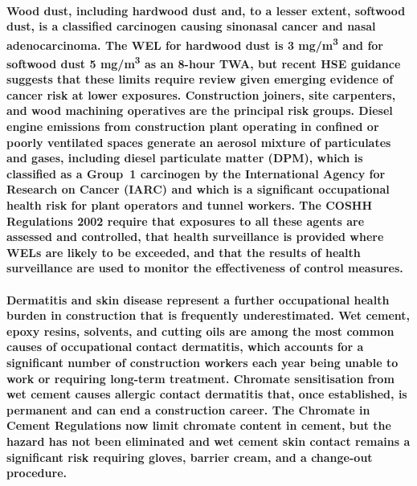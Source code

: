 \paragraph{Wood dust, including hardwood dust and, to a lesser extent, softwood dust, is a classified carcinogen causing sinonasal cancer and nasal adenocarcinoma. The WEL for hardwood dust is 3 mg/m\textsuperscript{3} and for softwood dust 5 mg/m\textsuperscript{3} as an 8-hour TWA, but recent HSE guidance suggests that these limits require review given emerging evidence of cancer risk at lower exposures. Construction joiners, site carpenters, and wood machining operatives are the principal risk groups. Diesel engine emissions from construction plant operating in confined or poorly ventilated spaces generate an aerosol mixture of particulates and gases, including diesel particulate matter (DPM), which is classified as a Group~1 carcinogen by the International Agency for Research on Cancer (IARC) and which is a significant occupational health risk for plant operators and tunnel workers. The COSHH Regulations 2002 require that exposures to all these agents are assessed and controlled, that health surveillance is provided where WELs are likely to be exceeded, and that the results of health surveillance are used to monitor the effectiveness of control measures.}

\paragraph{Dermatitis and skin disease represent a further occupational health burden in construction that is frequently underestimated. Wet cement, epoxy resins, solvents, and cutting oils are among the most common causes of occupational contact dermatitis, which accounts for a significant number of construction workers each year being unable to work or requiring long-term treatment. Chromate sensitisation from wet cement causes allergic contact dermatitis that, once established, is permanent and can end a construction career. The Chromate in Cement Regulations now limit chromate content in cement, but the hazard has not been eliminated and wet cement skin contact remains a significant risk requiring gloves, barrier cream, and a change-out procedure.}


